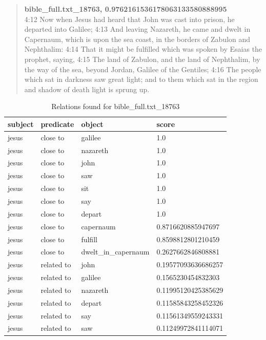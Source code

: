 \clearpage
\blockquote{
\textbf{bible\_full.txt\_18763, 0.9762161536178063133580888995}\\
4:12 Now when Jesus had heard that John was cast into prison, he departed into Galilee; 4:13 And leaving Nazareth, he came and dwelt in Capernaum, which is upon the sea coast, in the borders of Zabulon and Nephthalim: 4:14 That it might be fulfilled which was spoken by Esaias the prophet, saying, 4:15 The land of Zabulon, and the land of Nephthalim, by the way of the sea, beyond Jordan, Galilee of the Gentiles; 4:16 The people which sat in darkness saw great light; and to them which sat in the region and shadow of death light is sprung up.}
\begin{table}[H]
\centering
    \begin{tabular}{|l|l|l|l|}
    \hline
    subject & predicate & object & score \\
    \hline
    jesus &close to & galilee & 1.0\\
    jesus &close to& nazareth & 1.0\\
    jesus &close to& john & 1.0\\
    jesus &close to& saw & 1.0\\
    jesus &close to& sit & 1.0\\
    jesus &close to& say & 1.0\\
    jesus &close to& depart & 1.0\\
    jesus &close to& capernaum & 0.8716620885947697\\
    jesus &close to& fulfill & 0.8598812801210459\\
    jesus &close to& dwelt\_in\_capernaum & 0.2627662846808881\\
    \hline
    jesus & related to & john & 0.19577093636686257 \\
    jesus &related to & galilee & 0.1565230454832303 \\
    jesus &related to & nazareth & 0.11995120425385629 \\
    jesus &related to & depart & 0.11585843258452326 \\
    jesus &related to & say & 0.11561349559243331 \\
    jesus &related to & saw & 0.11249972841114071 \\
    \hline
\end{tabular}
\caption{Relations found for bible\_full.txt\_18763}
\label{tab:relations_jesus_18763}
\end{table}


